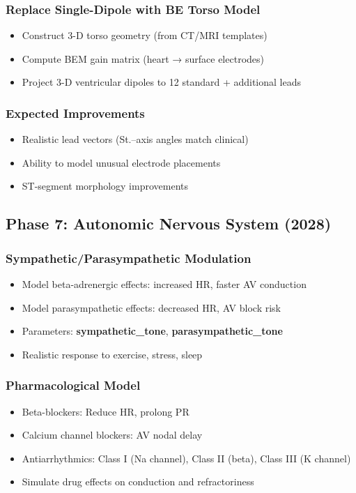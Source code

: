\documentclass[11pt, a4paper]{article}
\begin{document}
\subsubsection{Replace Single-Dipole with BE Torso Model}
\begin{itemize}
    \item Construct 3-D torso geometry (from CT/MRI templates)
    \item Compute BEM gain matrix (heart → surface electrodes)
    \item Project 3-D ventricular dipoles to 12 standard + additional leads
\end{itemize}

\subsubsection{Expected Improvements}
\begin{itemize}
    \item Realistic lead vectors (St.--axis angles match clinical)
    \item Ability to model unusual electrode placements
    \item ST-segment morphology improvements
\end{itemize}

\subsection{Phase 7: Autonomic Nervous System (2028)}

\subsubsection{Sympathetic/Parasympathetic Modulation}
\begin{itemize}
    \item Model beta-adrenergic effects: increased HR, faster AV conduction
    \item Model parasympathetic effects: decreased HR, AV block risk
    \item Parameters: \textbf{sympathetic\_tone}, \textbf{parasympathetic\_tone}
    \item Realistic response to exercise, stress, sleep
\end{itemize}

\subsubsection{Pharmacological Model}
\begin{itemize}
    \item Beta-blockers: Reduce HR, prolong PR
    \item Calcium channel blockers: AV nodal delay
    \item Antiarrhythmics: Class I (Na channel), Class II (beta), Class III (K channel)
    \item Simulate drug effects on conduction and refractoriness
\end{itemize}
\end{document}
